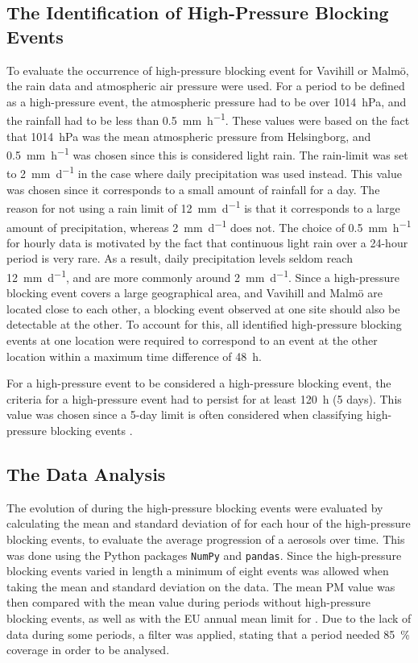\subsection{The Identification of High-Pressure Blocking Events}
To evaluate the occurrence of high-pressure blocking event for Vavihill or Malmö, the rain data and atmospheric air pressure were used. For a period to be defined as a high-pressure event, the atmospheric pressure had to be over \SI{1014}{\hecto\pascal}, and the rainfall had to be less than \SI{0.5}{\mm\per\hour}. These values were based on the fact that \SI{1014}{\hecto\pascal} was the mean atmospheric pressure from Helsingborg, and \SI{0.5}{\mm\per\hour} was chosen since this is considered light rain. The rain-limit was set to \SI{2}{\mm\per\day} in the case where daily precipitation was used instead. This value was chosen since it corresponds to a small amount of rainfall for a day. The reason for not using a rain limit of \SI{12}{\mm\per\day} is that it corresponds to a large amount of precipitation, whereas \SI{2}{\mm\per\day} does not. The choice of \SI{0.5}{\mm\per\hour} for hourly data is motivated by the fact that continuous light rain over a 24-hour period is very rare. As a result, daily precipitation levels seldom reach \SI{12}{\mm\per\day}, and are more commonly around \SI{2}{\mm\per\day}. Since a high-pressure blocking event covers a large geographical area, and Vavihill and Malmö are located close to each other, a blocking event observed at one site should also be detectable at the other. To account for this, all identified high-pressure blocking events at one location were required to correspond to an event at the other location within a maximum time difference of \SI{48}{\hour}. 

For a high-pressure event to be considered a high-pressure blocking event, the criteria for a high-pressure event had to persist for at least \SI{120}{\hour} (5 days). This value was chosen since a 5-day limit is often considered when classifying high-pressure blocking events \cite{lupoAtmosphericBlockingEvents2020}. 

\subsection{The Data Analysis}
The evolution of \PM during the high-pressure blocking events were evaluated by calculating the mean and standard deviation of \PM for each hour of the high-pressure blocking events, to evaluate the average progression of a aerosols over time. This was done using the Python packages \texttt{NumPy} and \texttt{pandas}. Since the high-pressure blocking events varied in length a minimum of eight events was allowed when taking the mean and standard deviation on the \PM data. The mean PM value was then compared with the mean \PM value during periods without high-pressure blocking events, as well as with the EU annual mean limit for \PM. Due to the lack of \PM data during some periods, a filter was applied, stating that a period needed \SI{85}{\%} \PM coverage in order to be analysed.


